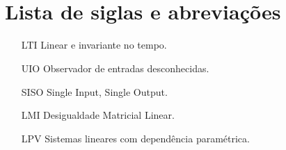 \section{\\Lista de siglas e abreviações}
    \begin{itemize} 
        \item [LTI] Linear e invariante no tempo.
        \item [UIO] Observador de entradas desconhecidas.
        \item [SISO] Single Input, Single Output.
        \item [LMI] Desigualdade Matricial Linear.
        \item [LPV] Sistemas lineares com dependência paramétrica.
    \end{itemize}
\section{}\listoffigures